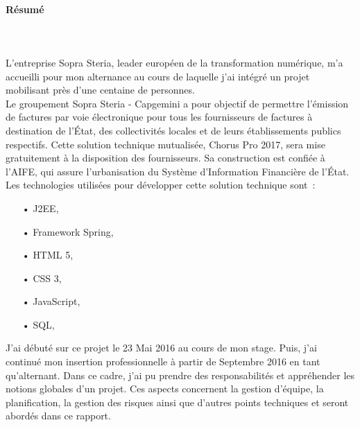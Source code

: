 \documentclass[12pt,a4paper]{article}
\begin{document}
\paragraph{Résumé}
~~\\\\
L'entreprise Sopra Steria, leader européen de la transformation numérique, m'a accueilli pour mon alternance au cours de laquelle j'ai intégré un projet mobilisant près d'une centaine de personnes.\\
Le groupement Sopra Steria - Capgemini a pour objectif de permettre l’émission de factures par voie électronique pour tous les fournisseurs de factures à destination de l’État, des collectivités locales et de leurs établissements publics respectifs.
Cette solution technique mutualisée, Chorus Pro 2017, sera mise gratuitement à la disposition des fournisseurs. Sa construction est confiée à l'\gls{AIFE}, qui assure l’urbanisation du Système d’Information Financière de l’État.
Les technologies utilisées pour développer cette solution technique sont~:
\smallbreak
\begin{itemize}
\item[•] \gls{J2EE},
\item[•] Framework Spring,
\item[•] \gls{HTML} 5,
\item[•] \gls{CSS} 3,
\item[•] JavaScript,
\item[•] \gls{SQL},
\end{itemize}
\medbreak
J'ai débuté sur ce projet le 23 Mai 2016 au cours de mon stage. Puis, j’ai continué mon insertion professionnelle à partir de Septembre 2016 en tant qu'alternant.
\smallbreak
Dans ce cadre, j'ai pu prendre des responsabilités et appréhender les notions globales d’un projet. Ces aspects concernent la gestion d’équipe, la planification, la gestion des risques ainsi que
d’autres points techniques et seront abordés dans ce rapport.
\newpage
\end{document}
